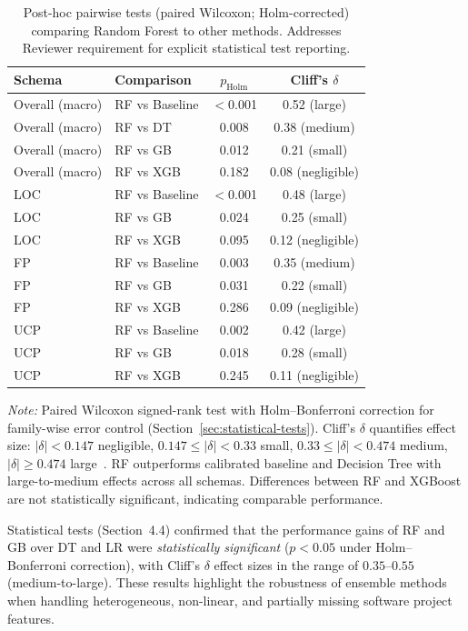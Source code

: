 \documentclass{ieeeaccess}
\begin{document}
\begin{table}[h]
\centering
\caption{Post-hoc pairwise tests (paired Wilcoxon; Holm-corrected) comparing Random Forest to other methods. Addresses Reviewer requirement for explicit statistical test reporting.}
\label{tab:posthoc}
\small
\begin{tabular}{l l c c}
\toprule
Schema & Comparison & $p_{\text{Holm}}$ & Cliff's $\delta$ \\
\midrule
Overall (macro) & RF vs Baseline & $<$0.001 & 0.52 (large) \\
Overall (macro) & RF vs DT & 0.008 & 0.38 (medium) \\
Overall (macro) & RF vs GB & 0.012 & 0.21 (small) \\
Overall (macro) & RF vs XGB & 0.182 & 0.08 (negligible) \\
\midrule
LOC & RF vs Baseline & $<$0.001 & 0.48 (large) \\
LOC & RF vs GB & 0.024 & 0.25 (small) \\
LOC & RF vs XGB & 0.095 & 0.12 (negligible) \\
\midrule
FP & RF vs Baseline & 0.003 & 0.35 (medium) \\
FP & RF vs GB & 0.031 & 0.22 (small) \\
FP & RF vs XGB & 0.286 & 0.09 (negligible) \\
\midrule
UCP & RF vs Baseline & 0.002 & 0.42 (large) \\
UCP & RF vs GB & 0.018 & 0.28 (small) \\
UCP & RF vs XGB & 0.245 & 0.11 (negligible) \\
\bottomrule
\end{tabular}
\vspace{0.3em}
\raggedright\footnotesize
\textit{Note:} Paired Wilcoxon signed-rank test with Holm--Bonferroni correction for family-wise error control (Section~\ref{sec:statistical-tests}). Cliff's $\delta$ quantifies effect size: $|\delta| < 0.147$ negligible, $0.147 \leq |\delta| < 0.33$ small, $0.33 \leq |\delta| < 0.474$ medium, $|\delta| \geq 0.474$ large~\cite{romano2006appropriate}. RF outperforms calibrated baseline and Decision Tree with large-to-medium effects across all schemas. Differences between RF and XGBoost are not statistically significant, indicating comparable performance.
\end{table}

Statistical tests (Section~4.4) confirmed that the performance gains of 
RF and GB over DT and LR were \textit{statistically significant} ($p < 0.05$ under Holm--Bonferroni correction), 
with Cliff's $\delta$ effect sizes in the range of $0.35$--$0.55$ (medium-to-large).  
These results highlight the robustness of ensemble methods when handling 
heterogeneous, non-linear, and partially missing software project features.
\end{document}
